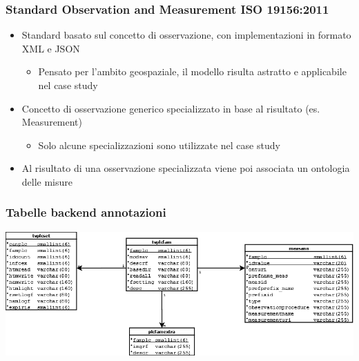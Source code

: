 \documentclass{beamer}
\begin{document}
\begin{frame}
\frametitle{Standard Observation and Measurement ISO 19156:2011}
\begin{itemize}
\item Standard basato sul concetto di osservazione, con implementazioni in formato XML e JSON
\begin{itemize}
\item Pensato per l'ambito geospaziale, il modello risulta astratto e applicabile nel case study
\end{itemize}
\item Concetto di osservazione generico specializzato in base al risultato (es. Measurement)
\begin{itemize}
\item Solo alcune specializzazioni sono utilizzate nel case study
\end{itemize}
\item Al risultato di una osservazione specializzata viene poi associata un ontologia delle misure
\end{itemize}	
\end{frame}

\begin{frame}
\frametitle{Tabelle backend annotazioni}
\includegraphics[width=1\textwidth]{images/AltreTabelleAnnotazioniMOD4.png}
\end{frame}



\end{document}
